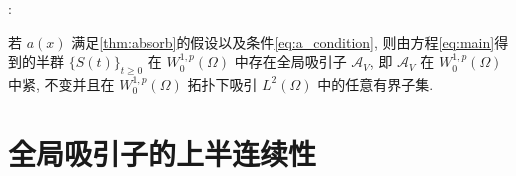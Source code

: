 \documentclass[UTF8]{ctexbeamer}
\newcommand*\abs[1]{\lvert#1\rvert}
\newcommand*\norm[1]{\lVert#1\rVert}
\newcommand*\Brace[1]{\lbrace#1\rbrace}
\begin{document}


\begin{frame}{\secname : \subsecname}

    \begin{theorem}
        若 $a(x)$ 满足\cref{thm:absorb}的假设以及条件\eqref{eq:a_condition},
        则由方程\eqref{eq:main}得到的半群 $\Brace{S(t)}_{t \geq 0}$ 在 $W_0^{1,p}(\Omega)$
        中存在全局吸引子 $\mathcal{A}_V$, 即
        $\mathcal{A}_V$ 在 $W_0^{1,p}(\Omega)$ 中紧, 不变并且在 $W_0^{1,p}(\Omega)$
        拓扑下吸引 $L^2(\Omega)$ 中的任意有界子集.
    \end{theorem}

\end{frame}
\section{全局吸引子的上半连续性}
\end{document}
